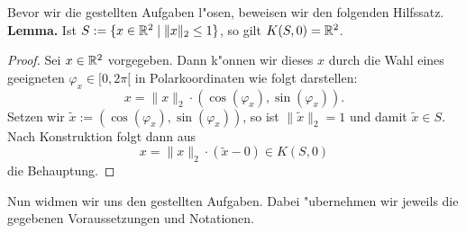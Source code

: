 \newcommand{\e}{\varepsilon}
\newcommand{\M}{\partial{M}}

Bevor wir die gestellten Aufgaben l"osen, beweisen wir den folgenden Hilfssatz.\\

\textbf{Lemma.} Ist $S:=\{x\in\mathbb{R}^2 \mid \|x\|_2 \le 1\}$, so gilt $K(S,0)=\mathbb{R}^2$.

\begin{proof}
Sei $x\in\mathbb{R}^2$ vorgegeben. Dann k"onnen wir dieses $x$ durch die Wahl eines
geeigneten $\varphi_x \in [0,2\pi[$ in Polarkoordinaten wie folgt darstellen:
\[
x = \|x\|_2 \cdot (\cos(\varphi_x), \sin(\varphi_x)).
\]
Setzen wir $\widetilde{x} := (\cos(\varphi_x), \sin(\varphi_x))$, so ist $\|\widetilde{x}\|_2 = 1$
und damit $\widetilde{x} \in S$. Nach Konstruktion folgt dann aus
\[
x = \|x\|_2\cdot(\widetilde{x}-0) \in K(S,0)
\]
die Behauptung.
\end{proof}

Nun widmen wir uns den gestellten Aufgaben. Dabei "ubernehmen wir jeweils die
gegebenen Voraussetzungen und Notationen.

